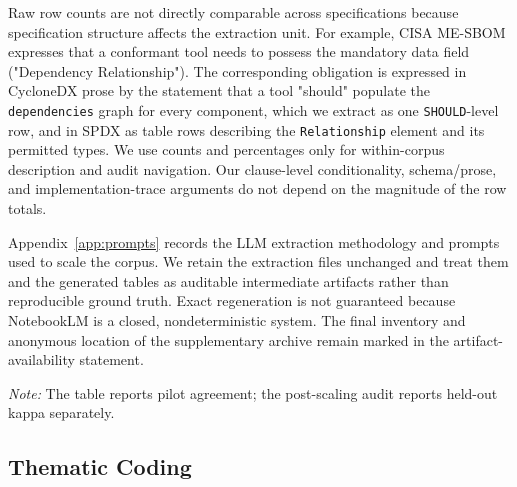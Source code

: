 Raw row counts are not directly comparable across specifications because specification structure affects the extraction unit. For example, CISA ME-SBOM expresses that a conformant tool needs to possess the mandatory data field ("Dependency Relationship"). The corresponding obligation is expressed in CycloneDX prose by the statement that a tool "should" populate the \texttt{dependencies} graph for every component, which we extract as one \texttt{SHOULD}-level row, and in SPDX as table rows describing the \texttt{Relationship} element and its permitted types. We use counts and percentages only for within-corpus description and audit navigation. Our clause-level conditionality, schema/prose, and implementation-trace arguments do not depend on the magnitude of the row totals.

Appendix~\ref{app:prompts} records the LLM extraction methodology and prompts used to scale the corpus. We retain the extraction files unchanged and treat them and the generated tables as auditable intermediate artifacts rather than reproducible ground truth. Exact regeneration is not guaranteed because NotebookLM is a closed, nondeterministic system. The final inventory and anonymous location of the supplementary archive remain marked in the artifact-availability statement.

\begin{table}[t]
\caption{Cohen's Kappa ($\kappa$) for Pilot Requirement-Extraction Agreement.}
\label{tab:iar_kappa_scores}
\centering
{}
\par\smallskip
{\scriptsize\emph{Note:} The table reports pilot agreement; the post-scaling audit reports held-out kappa separately.}
\end{table}

\subsection{Thematic Coding}
\label{subsec:thematiccoding}

